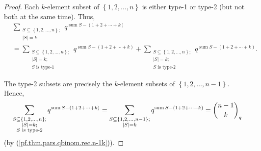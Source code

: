 \begin{proof}
Each $k$-element subset of $\left\{  1,2,\ldots,n\right\}  $ is either type-1
or type-2 (but not both at the same time). Thus,%
\begin{align*}
&  \sum_{\substack{S\subseteq\left\{  1,2,\ldots,n\right\}  ;\\\left\vert
S\right\vert =k}}q^{\operatorname*{sum}S-\left(  1+2+\cdots+k\right)  }\\
&  =\sum_{\substack{S\subseteq\left\{  1,2,\ldots,n\right\}  ;\\\left\vert
S\right\vert =k;\\S\text{ is type-1}}}q^{\operatorname*{sum}S-\left(
1+2+\cdots+k\right)  }+\sum_{\substack{S\subseteq\left\{  1,2,\ldots
,n\right\}  ;\\\left\vert S\right\vert =k;\\S\text{ is type-2}}%
}q^{\operatorname*{sum}S-\left(  1+2+\cdots+k\right)  }.
\end{align*}


The type-2 subsets are precisely the $k$-element subsets of $\left\{
1,2,\ldots,n-1\right\}  $. Hence,%
\[
\sum_{\substack{S\subseteq\left\{  1,2,\ldots,n\right\}  ;\\\left\vert
S\right\vert =k;\\S\text{ is type-2}}}q^{\operatorname*{sum}S-\left(
1+2+\cdots+k\right)  }=\sum_{\substack{S\subseteq\left\{  1,2,\ldots
,n-1\right\}  ;\\\left\vert S\right\vert =k}}q^{\operatorname*{sum}S-\left(
1+2+\cdots+k\right)  }=\dbinom{n-1}{k}_{q}%
\]
(by (\ref{pf.thm.pars.qbinom.rec.n-1k})).


\end{proof}
